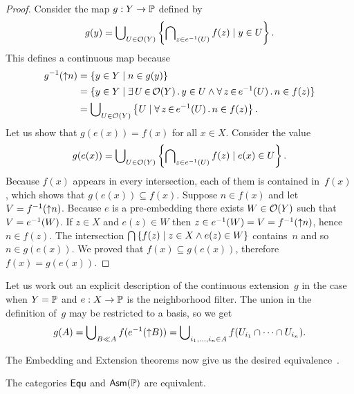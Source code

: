\begin{proof}
  Consider the map $g : Y \to \mathbb{P}$ defined by
  \begin{equation*}
    g(y) = \bigcup\nolimits_{U \in \mathcal{O}(Y)} \left\{
      \bigcap\nolimits_{z \in {e}^{-1}(U)} f(z)
      \mid
      y \in U
    \right\}.
  \end{equation*}
  This defines a continuous map because
  \begin{align*}
    \invim{g}(\upper{n}) &=
    \set{y \in Y \such n \in g(y)} \\
    &=
    \set{y \in Y \such \xsome{U}{
        \topol{Y}}{y \in U \land
        \xall{z}{\invim{e}(U)}{n \in f(z)}
      }
    } \\
    &=
    \tbigcup_{U \in \topol{Y}} \left\{
        U \such
        \xall{z}{\invim{e}(U)}{n \in f(z)}
      \right\}.
  \end{align*}
  Let us show that $g(e(x)) = f(x)$ for all $x \in X$. Consider the
  value
  \begin{align*}
    g(e(x)) =
    \bigcup\nolimits_{U \in \mathcal{O}(Y)} \left\{
      \bigcap\nolimits_{z \in {e}^{-1}(U)} f(z)
      \mid
      e(x) \in U \right\}.
  \end{align*}
  Because $f(x)$ appears in every intersection, each of them is
  contained in~$f(x)$, which shows that $g(e(x)) \subseteq f(x)$.
  Suppose $n \in f(x)$ and let $V = {f}^{-1}({\uparrow}n)$. Because $e$
  is a pre-embedding there exists $W \in \mathcal{O}(Y)$ such that $V =
  {e}^{-1}(W)$. If $z \in X$ and $e(z) \in W$ then $z \in
  {e}^{-1}(W) = V = {f}^{-1}({\uparrow}n)$, hence $n \in f(z)$. The
  intersection $\bigcap\nolimits \left\{f(z) \mid z \in X \land e(z) \in W
  \right\}$ contains~$n$ and so $n \in g(e(x))$. We proved that $f(x)
  \subseteq g(e(x))$, therefore $f(x) = g(e(x))$.
\end{proof}

\noindent
%
Let us work out an explicit description of the continuous
extension~$g$ in the case when $Y = \mathbb{P}$ and $e : X \to \mathbb{P}$ is
the neighborhood filter. The union in the definition of~$g$ may be
restricted to a basis, so we get
%
\begin{equation*}
  g(A) = \bigcup\nolimits_{B \ll A} f({e}^{-1}({\uparrow}B)) =
  \bigcup\nolimits_{i_1, \ldots, i_n \in A}
  f(U_{i_1} \cap \cdots \cap U_{i_n}).
\end{equation*}

The Embedding and Extension theorems now give us the desired
equivalence~\cite{Simpson-Menni}.

\begin{proposition}
  \label{prop:equ-equiv-asm-scott}%
  The categories $\mathsf{Equ}$ and $\mathsf{Asm}(\mathbb{P})$ are equivalent.
\end{proposition}

